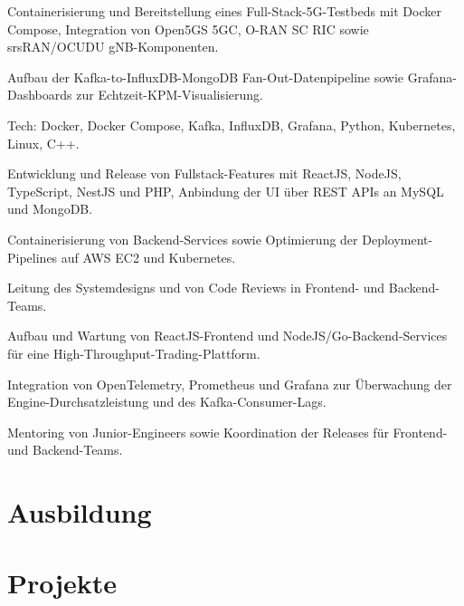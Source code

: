 \documentclass[10pt,a4paper]{resume}
\begin{document}
\bullets
  \item Containerisierung und Bereitstellung eines Full-Stack-5G-Testbeds mit Docker Compose, Integration von Open5GS 5GC, O-RAN SC RIC sowie srsRAN/OCUDU gNB-Komponenten.
  \item Aufbau der Kafka-to-InfluxDB-MongoDB Fan-Out-Datenpipeline sowie Grafana-Dashboards zur Echtzeit-KPM-Visualisierung.
  \item Tech: Docker, Docker Compose, Kafka, InfluxDB, Grafana, Python, Kubernetes, Linux, C++.
\bulletsend
\vspace{1.5pt}
\bullets
  \item Entwicklung und Release von Fullstack-Features mit ReactJS, NodeJS, TypeScript, NestJS und PHP, Anbindung der UI über REST APIs an MySQL und MongoDB.
  \item Containerisierung von Backend-Services sowie Optimierung der Deployment-Pipelines auf AWS EC2 und Kubernetes.
  \item Leitung des Systemdesigns und von Code Reviews in Frontend- und Backend-Teams.
\bulletsend
\vspace{1.5pt}
\bullets
  \item Aufbau und Wartung von ReactJS-Frontend und NodeJS/Go-Backend-Services für eine High-Throughput-Trading-Plattform.
  \item Integration von OpenTelemetry, Prometheus und Grafana zur Überwachung der Engine-Durchsatzleistung und des Kafka-Consumer-Lags.
  \item Mentoring von Junior-Engineers sowie Koordination der Releases für Frontend- und Backend-Teams.
\bulletsend
\vspace{1.5pt}

\section{Ausbildung}

\vspace{2pt}

\section{Projekte}
\end{document}
